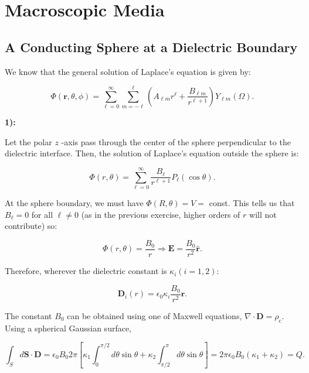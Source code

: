 \section{Macroscopic Media}


\subsection{A Conducting Sphere at a Dielectric Boundary}\label{A Conducting Sphere at a Dielectric Boundary}

We know that the general solution of Laplace's equation is given by:

\begin{equation}
	\Phi(\mathbf{r},\theta, \phi)=\sum_{\ell=0}^{\infty} \sum_{m=-\ell}^{\ell}\left( A_{\ell m} r^{\ell}  + \frac{B_{\ell m}}{r^{\ell+1}} \right) Y_{\ell m}(\Omega).
\end{equation}

\textbf{1):}

Let the polar $z$ -axis pass through the center of the sphere perpendicular to the dielectric interface. Then, the solution of Laplace's equation outside the sphere is:

\begin{equation}
	\Phi(r, \theta)=\sum_{\ell=0}^{\infty} \frac{B_{\ell}}{r^{\ell+1}} P_{\ell}(\cos \theta).
\end{equation}

At the sphere boundary, we must have $\Phi(R, \theta)= V =$ const. This tells us that $B_{\ell}=0$ for all $\ell \neq 0$ (as in the previous exercise, higher orders of $r$ will not contribute) so:
	
\begin{equation}
	\Phi(r, \theta)=\frac{B_{0}}{r} \Rightarrow \mathbf{E}=\frac{B_{0}}{r^{2}} \hat{\mathbf{r}} .
\end{equation}

Therefore, wherever the dielectric constant is $\kappa_{i}(i=1,2)$:

\begin{equation}
	\mathbf{D}_{i}(r)=\epsilon_{0} \kappa_{i} \frac{B_{0}}{r^{2}} \hat{\mathbf{r}}.
\end{equation}

The constant $B_{0}$ can be obtained using one of Maxwell equations, $\nabla \cdot \mathbf{D}=\rho_{\mathrm{c}} .$ Using a spherical Gaussian surface,

\begin{equation}
	\int_{S} d \mathbf{S} \cdot \mathbf{D}=\epsilon_{0} B_{0} 2 \pi\left[\kappa_{1} \int_{0}^{\pi / 2} d \theta \sin \theta+\kappa_{2} \int_{\pi / 2}^{\pi} d \theta \sin \theta\right]=2 \pi \epsilon_{0} B_{0}\left(\kappa_{1}+\kappa_{2}\right)=Q.
\end{equation}

